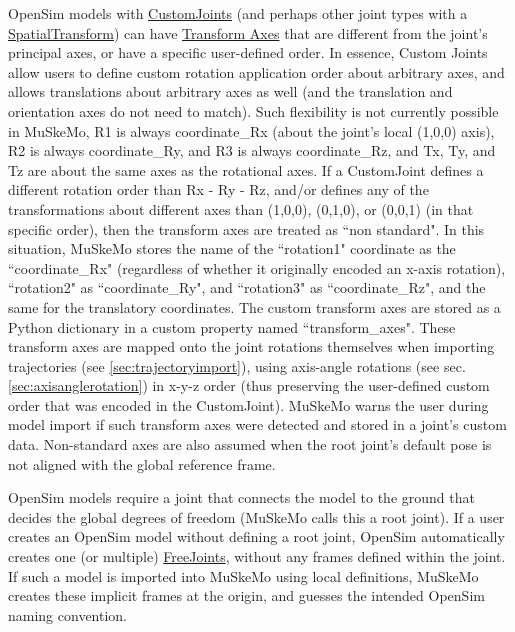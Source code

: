 \documentclass{article}
\begin{document}
OpenSim models with \href{https://simtk.org/api_docs/opensim/api_docs/classOpenSim_1_1CustomJoint.html}{CustomJoints} (and perhaps other joint types with a \href{https://simtk.org/api_docs/opensim/api_docs/classOpenSim_1_1SpatialTransform.html}{SpatialTransform}) can have \href{https://simtk.org/api_docs/opensim/api_docs/classOpenSim_1_1TransformAxis.html}{Transform Axes} that are different from the joint's principal axes, or have a specific user-defined order. In essence, Custom Joints allow users to define custom rotation application order about arbitrary axes, and allows translations about arbitrary axes as well (and the translation and orientation axes do not need to match). Such flexibility is not currently possible in MuSkeMo, R1 is always coordinate\_Rx (about the joint's local (1,0,0) axis), R2 is always coordinate\_Ry, and R3 is always coordinate\_Rz, and Tx, Ty, and Tz are about the same axes as the rotational axes. If a CustomJoint defines a different rotation order than Rx - Ry - Rz, and/or defines any of the transformations about different axes than (1,0,0), (0,1,0), or (0,0,1) (in that specific order), then the transform axes are treated as ``non standard". In this situation, MuSkeMo stores the name of the ``rotation1" coordinate as the ``coordinate\_Rx" (regardless of whether it originally encoded an x-axis rotation), ``rotation2" as ``coordinate\_Ry", and ``rotation3" as ``coordinate\_Rz", and the same for the translatory coordinates. The custom transform axes are stored as a Python dictionary in a custom property named ``transform\_axes". These transform axes are mapped onto the joint rotations themselves when importing trajectories (see \ref{sec:trajectoryimport}), using axis-angle rotations (see sec. \ref{sec:axisanglerotation}) in x-y-z order (thus preserving the user-defined custom order that was encoded in the CustomJoint). MuSkeMo warns the user during model import if such transform axes were detected and stored in a joint's custom data.
Non-standard axes are also assumed when the root joint's default pose is not aligned with the global reference frame.


OpenSim models require a joint that connects the model to the ground that decides the global degrees of freedom (MuSkeMo calls this a root joint). If a user creates an OpenSim model without defining a root joint, OpenSim automatically creates one (or multiple) \href{https://simtk.org/api_docs/opensim/api_docs/classOpenSim_1_1FreeJoint.html}{FreeJoints}, without any frames defined within the joint. If such a model is imported into MuSkeMo using local definitions, MuSkeMo creates these implicit frames at the origin, and guesses the intended OpenSim naming convention.
\end{document}
